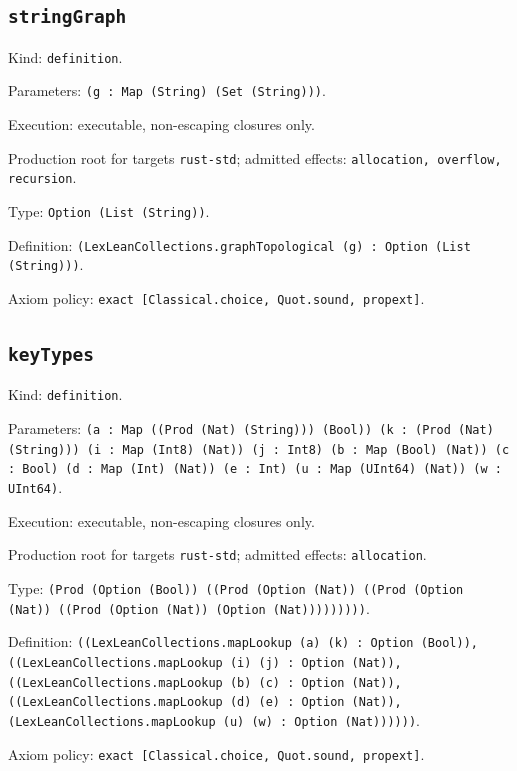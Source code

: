 \documentclass[11pt]{article}
\begin{document}
\subsection*{\texttt{stringGraph}}
\noindent Kind: \texttt{definition}.\par
\noindent Parameters: \texttt{(g : Map (String) (Set (String)))}.\par
\noindent Execution: executable, non-escaping closures only.\par
\noindent Production root for targets \texttt{rust-std}; admitted effects: \texttt{allocation, overflow, recursion}.\par
\noindent Type: \texttt{Option (List (String))}.\par
\noindent Definition: \texttt{(LexLeanCollections.graphTopological (g) : Option (List (String)))}.\par
\noindent Axiom policy: \texttt{exact [Classical.choice, Quot.sound, propext]}.\par
\subsection*{\texttt{keyTypes}}
\noindent Kind: \texttt{definition}.\par
\noindent Parameters: \texttt{(a : Map ((Prod (Nat) (String))) (Bool)) (k : (Prod (Nat) (String))) (i : Map (Int8) (Nat)) (j : Int8) (b : Map (Bool) (Nat)) (c : Bool) (d : Map (Int) (Nat)) (e : Int) (u : Map (UInt64) (Nat)) (w : UInt64)}.\par
\noindent Execution: executable, non-escaping closures only.\par
\noindent Production root for targets \texttt{rust-std}; admitted effects: \texttt{allocation}.\par
\noindent Type: \texttt{(Prod (Option (Bool)) ((Prod (Option (Nat)) ((Prod (Option (Nat)) ((Prod (Option (Nat)) (Option (Nat)))))))))}.\par
\noindent Definition: \texttt{((LexLeanCollections.mapLookup (a) (k) : Option (Bool)), ((LexLeanCollections.mapLookup (i) (j) : Option (Nat)), ((LexLeanCollections.mapLookup (b) (c) : Option (Nat)), ((LexLeanCollections.mapLookup (d) (e) : Option (Nat)), (LexLeanCollections.mapLookup (u) (w) : Option (Nat))))))}.\par
\noindent Axiom policy: \texttt{exact [Classical.choice, Quot.sound, propext]}.\par
\end{document}
